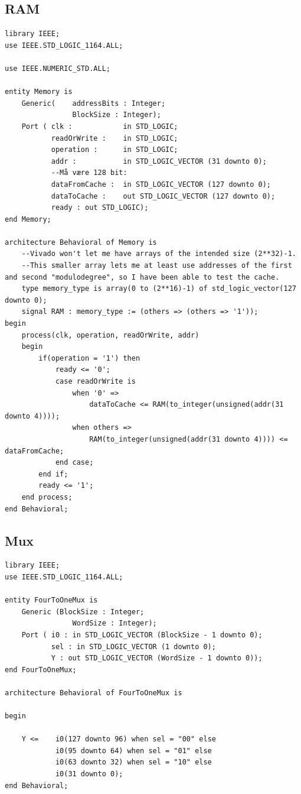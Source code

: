 \documentclass{article}
\begin{document}
\subsection{RAM}
\begin{lstlisting}
library IEEE;
use IEEE.STD_LOGIC_1164.ALL;

use IEEE.NUMERIC_STD.ALL;

entity Memory is
    Generic(    addressBits : Integer;
                BlockSize : Integer);
    Port ( clk :            in STD_LOGIC;
           readOrWrite :    in STD_LOGIC;
           operation :      in STD_LOGIC;
           addr :           in STD_LOGIC_VECTOR (31 downto 0);
           --Må være 128 bit:
           dataFromCache :  in STD_LOGIC_VECTOR (127 downto 0);
           dataToCache :    out STD_LOGIC_VECTOR (127 downto 0);
           ready : out STD_LOGIC);
end Memory;

architecture Behavioral of Memory is
    --Vivado won't let me have arrays of the intended size (2**32)-1.
    --This smaller array lets me at least use addresses of the first and second "modulodegree", so I have been able to test the cache.
    type memory_type is array(0 to (2**16)-1) of std_logic_vector(127 downto 0);
    signal RAM : memory_type := (others => (others => '1'));
begin
    process(clk, operation, readOrWrite, addr)
    begin
        if(operation = '1') then
            ready <= '0';
            case readOrWrite is
                when '0' =>
                    dataToCache <= RAM(to_integer(unsigned(addr(31 downto 4))));
                when others =>
                    RAM(to_integer(unsigned(addr(31 downto 4)))) <= dataFromCache;
            end case;
        end if;
        ready <= '1';
    end process;
end Behavioral;
\end{lstlisting}

\subsection{Mux}
\begin{lstlisting}
library IEEE;
use IEEE.STD_LOGIC_1164.ALL;

entity FourToOneMux is
    Generic (BlockSize : Integer;
                WordSize : Integer);
    Port ( i0 : in STD_LOGIC_VECTOR (BlockSize - 1 downto 0);
           sel : in STD_LOGIC_VECTOR (1 downto 0);
           Y : out STD_LOGIC_VECTOR (WordSize - 1 downto 0));
end FourToOneMux;

architecture Behavioral of FourToOneMux is

begin

    Y <=    i0(127 downto 96) when sel = "00" else
            i0(95 downto 64) when sel = "01" else
            i0(63 downto 32) when sel = "10" else
            i0(31 downto 0);
end Behavioral;
\end{lstlisting}
\newpage

\nocite{*}



\end{document}
